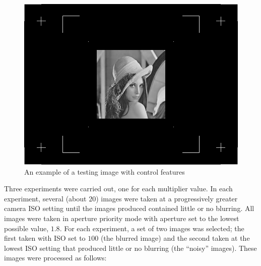 \documentclass[12pt,notitlepage]{report}
\begin{document}
\begin{figure}[htb]
 \begin{center}
  \includegraphics[width=12cm]{testing_image_control_points.png}
 \end{center}
 \caption{An example of a testing image with control features}
 \label{fig:testing_image_control_points}
\end{figure}

Three experiments were carried out, one for each multiplier value. In each experiment, several (about $20$) images were taken at a progressively greater camera ISO setting until the images produced contained little or no blurring. All images were taken in aperture priority mode with aperture set to the lowest possible value, $1.8$. For each experiment, a set of two images was selected; the first taken with ISO set to $100$ (the blurred image) and the second taken at the lowest ISO setting that produced little or no blurring (the ``noisy'' images). These images were processed as follows: 
\end{document}
